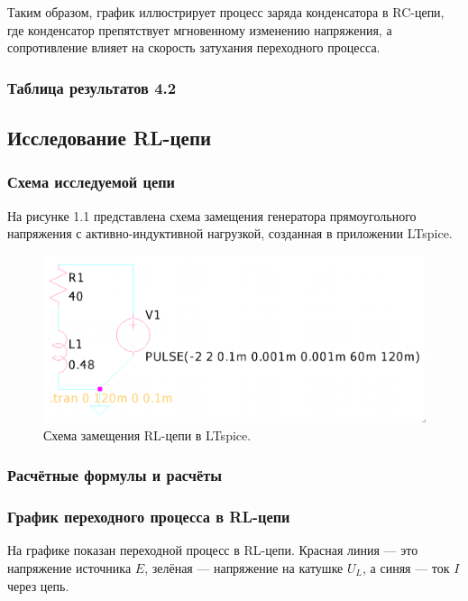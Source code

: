 Таким образом, график иллюстрирует процесс заряда конденсатора в RC-цепи, где конденсатор препятствует мгновенному изменению напряжения, а сопротивление влияет на скорость затухания переходного процесса.


\subsubsection{Таблица результатов 4.2}




\newpage
\subsection{Исследование RL-цепи}

\subsubsection{Схема исследуемой цепи}
На рисунке 1.1 представлена схема замещения генератора прямоугольного напряжения с активно-индуктивной нагрузкой, созданная в приложении LTspice.

\begin{figure}[H]
	\centering
	\includegraphics[width=1\textwidth]{./data/rl-schema.png}
	\caption{Схема замещения RL-цепи в LTspice.}
\end{figure}

\subsubsection{Расчётные формулы и расчёты}


\subsubsection{График переходного процесса в RL-цепи}
На графике показан переходной процесс в RL-цепи. Красная линия — это напряжение источника \( E \), зелёная — напряжение на катушке \( U_L \), а синяя — ток \( I \) через цепь.

